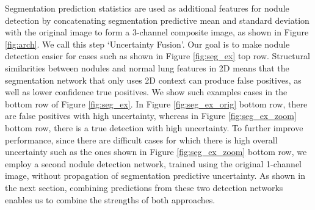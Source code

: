 \documentclass{article}
\begin{document}
Segmentation prediction statistics are used as additional features for nodule detection by concatenating segmentation predictive mean and standard deviation with the original image to form a 3-channel composite image, as shown in Figure \ref{fig:arch}. We call this step `Uncertainty Fusion'. Our goal is to make nodule detection easier for cases such as shown in Figure \ref{fig:seg_ex} top row. 
Structural similarities between nodules and normal lung features in 2D means that the segmentation network that only uses 2D context can produce false positives, as well as lower confidence true positives.
We show such examples cases in the bottom row of Figure \ref{fig:seg_ex}. In Figure \ref{fig:seg_ex_orig} bottom row, there are false positives with high uncertainty, whereas in Figure \ref{fig:seg_ex_zoom} bottom row, there is a true detection with high uncertainty. To further improve performance, since there are difficult cases for which there is high overall uncertainty such as the ones shown in Figure \ref{fig:seg_ex_zoom} bottom row, we employ a second nodule detection network, trained using the original 1-channel image, without propagation of segmentation predictive uncertainty. As shown in the next section, combining predictions from these two detection networks enables us to combine the strengths of both approaches. %
%
%
\end{document}
